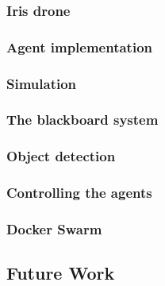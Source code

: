 \subsubsection{Iris drone}


\newpage 
\subsubsection{Agent implementation}


\newpage
\subsubsection{Simulation}


\newpage
\subsubsection{The blackboard system}


\newpage
\subsubsection{Object detection}


\newpage
\subsubsection{Controlling the agents}


\newpage
\subsubsection{Docker Swarm}


\newpage
\subsection{Future Work}
